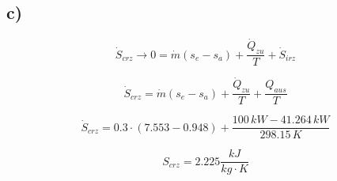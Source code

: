 

\subsection*{c)}

\[
\dot{S}_{crz} \rightarrow 0 = \dot{m} \left( s_e - s_a \right) + \frac{\dot{Q}_{zu}}{T} + \dot{S}_{irz}
\]

\[
\dot{S}_{crz} = \dot{m} \left( s_e - s_a \right) + \frac{\dot{Q}_{zu}}{T} + \frac{Q_{aus}}{T}
\]

\[
\dot{S}_{crz} = 0.3 \cdot \left( 7.553 - 0.948 \right) + \frac{100 \, kW - 41.264 \, kW}{298.15 \, K}
\]

\[
S_{crz} = 2.225 \frac{kJ}{kg \cdot K}
\]